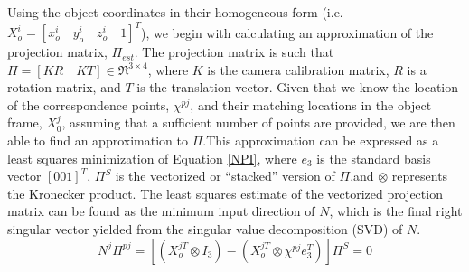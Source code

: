 \documentclass[12pt]{article}
\begin{document}
Using the object coordinates in their homogeneous form (i.e.\ $X_o^i = [x_o^i \quad y_o^i \quad z_o^i \quad 1]^T$), we begin with calculating an approximation of the projection matrix, $\Pi_{est}$. The projection matrix is such that $\Pi = [KR \quad KT] \in \Re^{3\times4}$, where $K$ is the camera calibration matrix, $R$ is a rotation matrix, and $T$ is the translation vector. Given that we know the location of the correspondence points, $\chi^{pj}$, and their matching locations in the object frame, $X_0^j$, assuming that a sufficient number of points are provided, we are then able to find an approximation to $\Pi$.This approximation can be expressed as a least squares minimization of Equation \ref{NPI}, where $e_3$ is the standard basis vector $[0 0 1]^T$, $\Pi^S$ is the vectorized or ``stacked'' version of $\Pi$,and $\otimes$ represents the Kronecker product. The least squares estimate of the vectorized projection matrix can be found as the minimum input direction of $N$, which is the final right singular vector yielded from the singular value decomposition (SVD) of $N$.  
\begin{equation}\label{NPI}
N^j\Pi^{pj} = [(X_o^{jT}\otimes I_3)-(X_o^{jT}\otimes \chi^{pj}e_3^T)]\Pi^S = 0
\end{equation}
\end{document}
